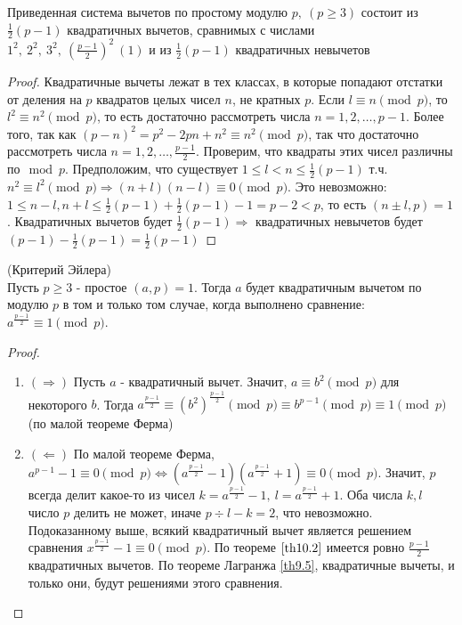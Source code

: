     \begin{theorem} \label{th10.2}
        Приведенная система вычетов по простому модулю $p,\ (p\geq 3)$ состоит из $\frac{1}{2}(p-1)$ квадратичных вычетов, сравнимых с числами\\
        $1^2,\ 2^2,\ 3^2,\ (\frac{p-1}{2})^2\ (1)$ и из $\frac{1}{2}(p-1)$ квадратичных невычетов
    \end{theorem} 
    \begin{proof}
        Квадратичные вычеты лежат в тех классах, в которые попадают отстатки от деления на $p$ квадратов целых чисел $n$, не кратных $p$. Если $l\equiv n\pmod{p}$, то $l^2\equiv n^2\pmod{p}$, то есть достаточно рассмотреть числа $n=1,2,\dots,p-1$. Более того, так как $(p-n)^2=p^2-2pn+n^2\equiv n^2\pmod{p}$, так что достаточно рассмотреть числа $n=1,2,\dots,\frac{p-1}{2}$. Проверим, что квадраты этих чисел различны по$\mod{p}$. Предположим, что существует $1\leq l<n\leq\frac{1}{2}(p-1)$ т.ч. $n^2\equiv l^2\pmod{p} \Rightarrow (n+l)(n-l)\equiv 0\pmod{p}$. Это невозможно: $1\leq n-l, n+l\leq \frac{1}{2}(p-1)+\frac{1}{2}(p-1)-1=p-2<p$, то есть $(n\pm l, p)=1$. Квадратичных вычетов будет $\frac{1}{2}(p-1) \Rightarrow$ квадратичных невычетов будет $(p-1)-\frac{1}{2}(p-1)=\frac{1}{2}(p-1)$
    \end{proof} 
    \begin{theorem} (Критерий Эйлера) \label{th10.3} \\
        Пусть $p\geq 3$ - простое $(a,p)=1$. Тогда $a$ будет квадратичным вычетом по модулю $p$ в том и только том случае, когда выполнено сравнение:\\
        $a^{\frac{p-1}{2}}\equiv 1\pmod{p}$.
    \end{theorem} 
    \begin{proof}\tab
        \begin{enumerate}
            \item $(\Rightarrow)$ Пусть $a$ - квадратичный вычет. Значит, $a\equiv b^2\pmod{p}$ для некоторого $b$. Тогда $a^{\frac{p-1}{2}}\equiv (b^2)^{\frac{p-1}{2}}\pmod{p}\equiv b^{p-1}\pmod{p}\equiv 1 \pmod{p}$ (по малой теореме Ферма)
            \item $(\Leftarrow)$ По малой теореме Ферма, $a^{p-1}-1\equiv 0\pmod{p}\Leftrightarrow (a^{\frac{p-1}{2}}-1)(a^{\frac{p-1}{2}}+1)\equiv 0\pmod{p}$. Значит, $p$ всегда делит какое-то из чисел $k=a^{\frac{p-1}{2}}-1,\ l=a^{\frac{p-1}{2}}+1$. Оба числа $k,l$ число $p$ делить не может, иначе $p\div l-k=2$, что невозможно. Подоказанному выше, всякий квадратичный вычет является решением сравнения $x^{\frac{p-1}{2}}-1\equiv 0\pmod{p}$. По теореме $\ref{th10.2}$ имеется ровно $\frac{p-1}{2}$ квадратичных вычетов. По теореме Лагранжа \eqref{th9.5}, квадратичные вычеты, и только они, будут решениями этого сравнения.
        \end{enumerate}
    \end{proof} 
